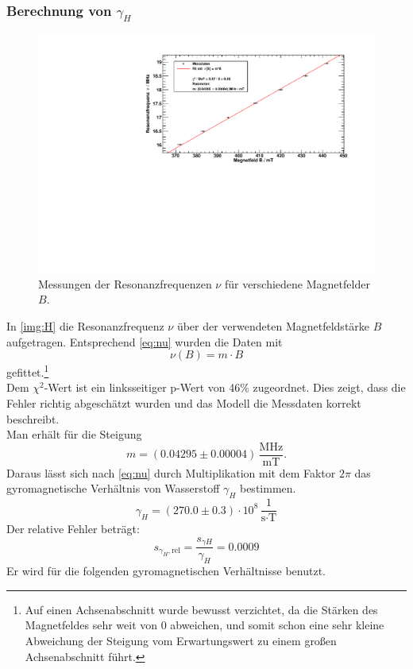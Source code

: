\subsubsection{Berechnung von $\gamma_H$}
\begin{figure}[H]
\begin{center}
  \includegraphics[width=\textwidth]{../img/03-H.pdf}
  \caption{Messungen der Resonanzfrequenzen $\nu$ für verschiedene Magnetfelder $B$.}
  \label{img:H}
\end{center}
\end{figure}
In \autoref{img:H} die Resonanzfrequenz $\nu$ über der verwendeten Magnetfeldstärke $B$ aufgetragen. Entsprechend \autoref{eq:nu} wurden 
die Daten mit 
\begin{equation}
  \nu(B) = m \cdot B
\end{equation}
gefittet.\footnote{Auf einen Achsenabschnitt wurde bewusst verzichtet, da die Stärken des Magnetfeldes sehr weit von 0 abweichen, und somit schon 
eine sehr kleine Abweichung der Steigung vom Erwartungswert zu einem großen Achsenabschnitt führt.} \\
Dem $\chi^2$-Wert ist ein linksseitiger p-Wert von 46\% zugeordnet. Dies zeigt, dass die Fehler richtig abgeschätzt wurden und das Modell 
die Messdaten korrekt beschreibt. \\
Man erhält für die Steigung
\begin{equation}
  m = (0.04295 \pm 0.00004)\,\frac{\text{MHz}}{\text{mT}}.
\end{equation}
Daraus lässt sich nach \autoref{eq:nu} durch Multiplikation mit dem Faktor $2 \pi$ das gyromagnetische Verhältnis von Wasserstoff $\gamma_H$ bestimmen. 
\begin{equation}
  \gamma_H = (270.0 \pm 0.3) \cdot 10^8\,\frac{1}{\text{s} \cdot \text{T}}
\end{equation}
Der relative Fehler beträgt:
\begin{equation}
  s_{\gamma_{H}, \text{rel}} = \frac{s_{\gamma H}}{\gamma_H} = 0.0009
\end{equation}
Er wird für die folgenden gyromagnetischen Verhältnisse benutzt.

